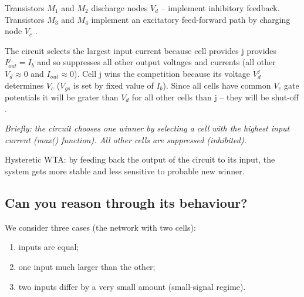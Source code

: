 \documentclass[main]{subfiles}
\begin{document}
Transistors $M_1$ and $M_2$ discharge nodes $V_d$ -- implement inhibitory feedback. Transistors $M_3$ and $M_4$
 implement an excitatory feed-forward path by charging node $V_c$ . 
 
 The circuit selects the largest input current because cell provides j provides $I_{out}^j = I_b$  and so suppresses all other output voltages and currents (all other $V_d \approx 0$ and $I_{out} \approx 0$). Cell j wins the competition because its voltage $V_d^j$
determines $V_c$ ($V_{gs}$ is set by fixed value of $I_b$). Since all cells have common $V_c$ gate potentials it will be grater than $V_d$ for all other cells than j -- they will be shut-off \cite{book:VLSI}. 




\textit{Briefly: the circuit chooses one winner by selecting a cell with the highest input current (max() function). All other cells are suppressed (inhibited).}

Hysteretic WTA: by feeding back the output of the circuit to its input, the system gets more stable and less sensitive to probable new winner.

\subsection{Can you reason through its behaviour?}
We consider three cases (the network with two cells): 

\begin{enumerate}[label={I.}]
\item inputs are equal; 
\item one input much larger than the other; 
\item two inputs differ by a very small amount (small-signal regime).
\end{enumerate}
\end{document}

